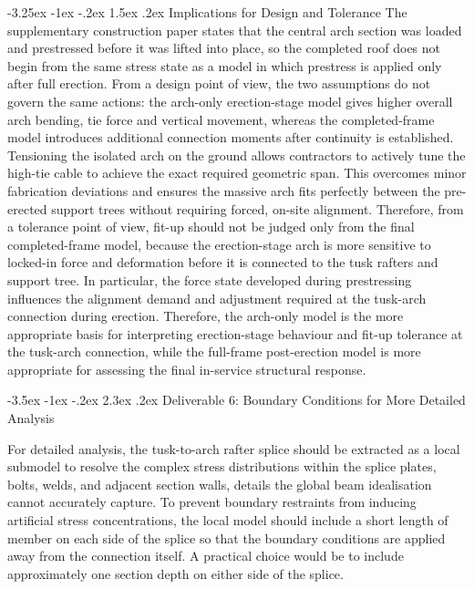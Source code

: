 \documentclass[10pt,a4paper]{article}
\makeatletter
\renewcommand\section{\@startsection{section}{1}{\z@}
  {-3.5ex \@plus -1ex \@minus -.2ex}
  {2.3ex \@plus .2ex}
  {\normalfont\Large}}
\renewcommand\subsection{\@startsection{subsection}{2}{\z@}
  {-3.25ex \@plus -1ex \@minus -.2ex}
  {1.5ex \@plus .2ex}
  {\normalfont\large}}
\makeatother
\begin{document}
\subsection{Implications for Design and Tolerance}
The supplementary construction paper states that the central arch section was loaded and prestressed before it was lifted into place, so the completed roof does not begin from the same stress state as a model in which prestress is applied only after full erection. From a design point of view, the two assumptions do not govern the same actions: the arch-only erection-stage model gives higher overall arch bending, tie force and vertical movement, whereas the completed-frame model introduces additional connection moments after continuity is established. Tensioning the isolated arch on the ground allows contractors to actively tune the high-tie cable to achieve the exact required geometric span. This overcomes minor fabrication deviations and ensures the massive arch fits perfectly between the pre-erected support trees without requiring forced, on-site alignment. Therefore, from a tolerance point of view, fit-up should not be judged only from the final completed-frame model, because the erection-stage arch is more sensitive to locked-in force and deformation before it is connected to the tusk rafters and support tree. In particular, the force state developed during prestressing influences the alignment demand and adjustment required at the tusk-arch connection during erection. Therefore, the arch-only model is the more appropriate basis for interpreting erection-stage behaviour and fit-up tolerance at the tusk-arch connection, while the full-frame post-erection model is more appropriate for assessing the final in-service structural response.

\newpage
\section{Deliverable 6: Boundary Conditions for More Detailed Analysis}

For detailed analysis, the tusk-to-arch rafter splice should be extracted as a local submodel to resolve the complex stress distributions within the splice plates, bolts, welds, and adjacent section walls, details the global beam idealisation cannot accurately capture. To prevent boundary restraints from inducing artificial stress concentrations, the local model should include a short length of member on each side of the splice so that the boundary conditions are applied away from the connection itself. A practical choice would be to include approximately one section depth on either side of the splice.
\end{document}
